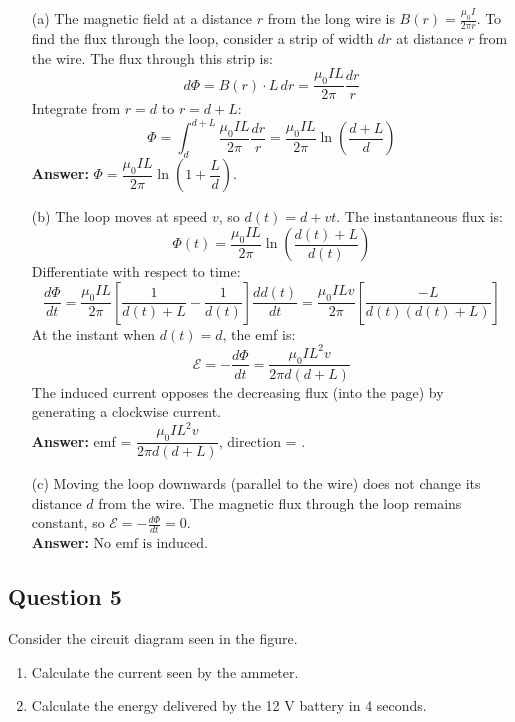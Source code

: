\documentclass{article}
\begin{document}
\begin{enumerate}
    \item[(a)] The magnetic field at a distance $r$ from the long wire is $B(r) = \frac{\mu_0 I}{2\pi r}$. To find the flux through the loop, consider a strip of width $dr$ at distance $r$ from the wire. The flux through this strip is:
    \[
    d\Phi = B(r) \cdot L \, dr = \frac{\mu_0 I L}{2\pi} \frac{dr}{r}
    \]
    Integrate from $r = d$ to $r = d + L$:
    \[
    \Phi = \int_{d}^{d + L} \frac{\mu_0 I L}{2\pi} \frac{dr}{r} = \frac{\mu_0 I L}{2\pi} \ln\left(\frac{d + L}{d}\right)
    \]
    \textbf{Answer:} $\boxed{\Phi = \dfrac{\mu_0 I L}{2\pi} \ln\left(1 + \dfrac{L}{d}\right)}$.
    
    \item[(b)] The loop moves at speed $v$, so $d(t) = d + vt$. The instantaneous flux is:
    \[
    \Phi(t) = \frac{\mu_0 I L}{2\pi} \ln\left(\frac{d(t) + L}{d(t)}\right)
    \]
    Differentiate with respect to time:
    \[
    \frac{d\Phi}{dt} = \frac{\mu_0 I L}{2\pi} \left[\frac{1}{d(t) + L} - \frac{1}{d(t)}\right] \frac{dd(t)}{dt} = \frac{\mu_0 I L v}{2\pi} \left[\frac{-L}{d(t)(d(t) + L)}\right]
    \]
    At the instant when $d(t) = d$, the emf is:
    \[
    \mathcal{E} = -\frac{d\Phi}{dt} = \frac{\mu_0 I L^2 v}{2\pi d(d + L)}
    \]
    The induced current opposes the decreasing flux (into the page) by generating a clockwise current. \\
    \textbf{Answer:} emf = $\boxed{\dfrac{\mu_0 I L^2 v}{2\pi d(d + L)}}$, direction = .
    
    \item[(c)] Moving the loop downwards (parallel to the wire) does not change its distance $d$ from the wire. The magnetic flux through the loop remains constant, so $\mathcal{E} = -\frac{d\Phi}{dt} = 0$. \\
    \textbf{Answer:} $\boxed{\text{No emf is induced.}}$
\end{enumerate}

\subsection{Question 5}
Consider the circuit diagram seen in the figure.
\begin{enumerate}
    \item Calculate the current seen by the ammeter.
    \item Calculate the energy delivered by the 12 V battery in 4 seconds.
\end{enumerate}
\end{document}
